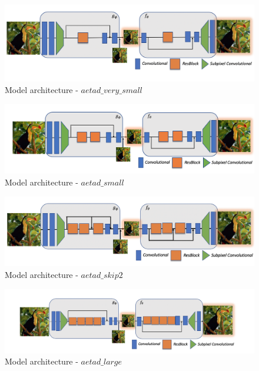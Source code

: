\begin{figure}[!ht]
\centering
\includegraphics[width=14cm]{figures/architecture_very_small.png}
\caption{Model architecture - $aetad\_very\_small$}
\end{figure}

\begin{figure}[!ht]
\centering
\includegraphics[width=14cm]{figures/architecture_small.png}
\caption{Model architecture - $aetad\_small$}
\end{figure}

\begin{figure}[!ht]
\centering
\includegraphics[width=14cm]{figures/architecture_skip2.png}
\caption{Model architecture - $aetad\_skip2$}
\end{figure}

\begin{figure}[!ht]
\centering
\includegraphics[width=14cm]{figures/architecture_large.png}
\caption{Model architecture - $aetad\_large$}
\end{figure}

